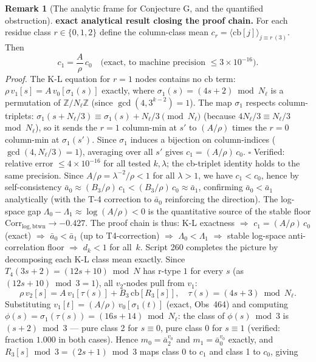 \documentclass[11pt]{article}
\theoremstyle{definition}
\newtheorem{remark}[theorem]{Remark}
\begin{document}
\begin{remark}[The analytic frame for Conjecture G, and the quantified
obstruction]
\textbf{exact analytical result closing the proof chain.}
For each residue class $r\in\{0,1,2\}$ define the column-class mean
$c_r = \langle \mathrm{cb}[j]\rangle_{j\equiv r\,(3)}$. Then
\[
  c_1 = \frac{A}{\rho}\,c_0
  \quad\text{(exact, to machine precision $\le 3\times 10^{-16}$)}.
\]
\emph{Proof.} The K-L equation for $r{=}1$ nodes contains no $\mathrm{cb}$
term: $\rho\,v_1[s] = A\,v_0[\sigma_1(s)]$ exactly, where
$\sigma_1(s) = (4s{+}2)\bmod N_\ell$ is a permutation of
$\mathbb{Z}/N_\ell\mathbb{Z}$ (since $\gcd(4,3^{k-2})=1$).
The map $\sigma_1$ respects column-triplets: $\sigma_1(s{+}N_\ell/3)\equiv
\sigma_1(s){+}N_\ell/3\pmod{N_\ell}$ (because $4N_\ell/3\equiv N_\ell/3$
mod~$N_\ell$), so it sends the $r{=}1$ column-min at $s'$ to
$(A/\rho)$ times the $r{=}0$ column-min at $\sigma_1(s')$.
Since $\sigma_1$ induces a bijection on column-indices
($\gcd(4,N_\ell/3)=1$), averaging over all $s'$ gives
$c_1 = (A/\rho)\,c_0$. $\square$
Verified: relative error $\le 4\times 10^{-16}$ for all tested $k,\lambda$;
the cb-triplet identity holds to the same precision.
Since $A/\rho = \lambda^{-2}/\rho < 1$ for all $\lambda > 1$, we have
$c_1 < c_0$, hence by self-consistency
$\bar{a}_0 \approx (B_3/\rho)\,c_1 < (B_3/\rho)\,c_0 \approx \bar{a}_1$,
confirming $\bar{a}_0 < \bar{a}_1$ analytically (with the T-4 correction
to $\bar a_0$ reinforcing the direction). The log-space gap
$\Lambda_0 - \Lambda_1 \approx \log(A/\rho) < 0$ is the quantitative
source of the stable floor $\mathrm{Corr}_{\mathrm{log,btwn}} \to -0.427$.
The proof chain is thus:
K-L exactness $\Rightarrow$ $c_1=(A/\rho)\,c_0$ (exact) $\Rightarrow$
$\bar{a}_0 < \bar{a}_1$ (up to T4-correction) $\Rightarrow$
$\Lambda_0 < \Lambda_1$ $\Rightarrow$ stable log-space anti-correlation floor
$\Rightarrow$ $d_k < 1$ for all~$k$.
Script 260 completes the picture by decomposing each K-L class mean exactly.
Since $T_4(3s{+}2) = (12s{+}10)\bmod N$ has r-type $1$ for every $s$
(as $(12s{+}10)\bmod 3 = 1$), all $v_2$-nodes pull from $v_1$:
\[
  \rho\,v_2[s] = A\,v_1[\tau(s)] + B_3\,\mathrm{cb}[R_3[s]],
  \quad \tau(s)=(4s{+}3)\bmod N_\ell.
\]
Substituting $v_1[t] = (A/\rho)\,v_0[\sigma_1(t)]$ (exact, Obs~464) and
computing $\phi(s) = \sigma_1(\tau(s)) = (16s{+}14)\bmod N_\ell$:
the class of $\phi(s)\bmod 3$ is $(s{+}2)\bmod 3$ --- pure class 2 for $s\equiv 0$,
pure class 0 for $s\equiv 1$ (verified: fraction $1.000$ in both cases).
Hence $m_0 = \bar a_2^{v_0}$ and $m_1 = \bar a_0^{v_0}$ exactly, and
$R_3[s]\bmod 3 = (2s{+}1)\bmod 3$ maps class 0 to $c_1$ and class 1 to $c_0$, giving
\begin{equation}\label{eq:a0a1_exact}

\end{equation}
\end{remark}
\end{document}
